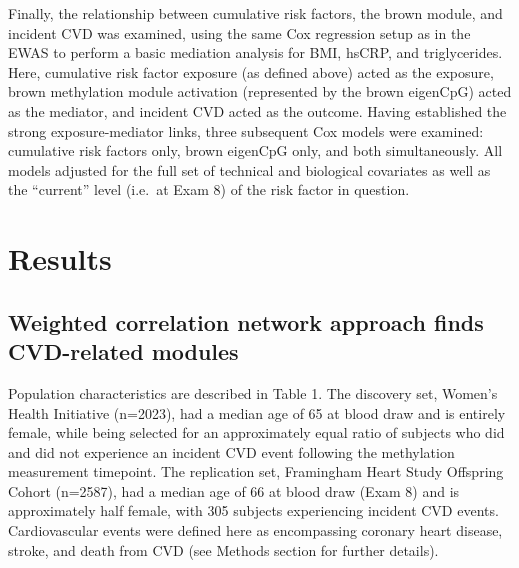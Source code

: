 \documentclass[]{bmcart}
\theoremstyle{definition}
\theoremstyle{definition}
\theoremstyle{definition}
\theoremstyle{remark}
\begin{document}
Finally, the relationship between cumulative risk factors, the brown
module, and incident CVD was examined, using the same Cox regression
setup as in the EWAS to perform a basic mediation analysis for BMI,
hsCRP, and triglycerides. Here, cumulative risk factor exposure (as
defined above) acted as the exposure, brown methylation module
activation (represented by the brown eigenCpG) acted as the mediator,
and incident CVD acted as the outcome. Having established the strong
exposure-mediator links, three subsequent Cox models were examined:
cumulative risk factors only, brown eigenCpG only, and both
simultaneously. All models adjusted for the full set of technical and
biological covariates as well as the ``current'' level (i.e.~at Exam 8)
of the risk factor in question.

\section{Results}\label{results}

\subsection{Weighted correlation network approach finds CVD-related
modules}\label{weighted-correlation-network-approach-finds-cvd-related-modules}

Population characteristics are described in Table 1. The discovery set,
Women's Health Initiative (n=2023), had a median age of 65 at blood draw
and is entirely female, while being selected for an approximately equal
ratio of subjects who did and did not experience an incident CVD event
following the methylation measurement timepoint. The replication set,
Framingham Heart Study Offspring Cohort (n=2587), had a median age of 66
at blood draw (Exam 8) and is approximately half female, with 305
subjects experiencing incident CVD events. Cardiovascular events were
defined here as encompassing coronary heart disease, stroke, and death
from CVD (see Methods section for further details).
\end{document}
